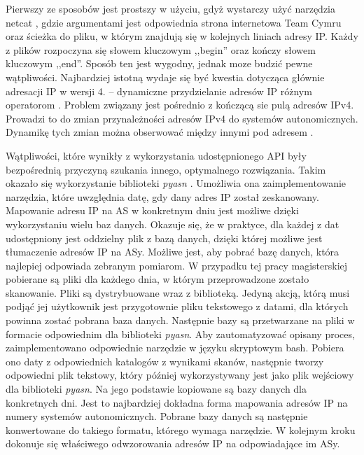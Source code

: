 Pierwszy ze sposobów jest prostszy w użyciu, gdyż wystarczy użyć narzędzia netcat \cite{netcat}, gdzie argumentami jest odpowiednia
strona internetowa Team Cymru \cite{cymru} oraz ścieżka do pliku, w którym znajdują się w kolejnych liniach adresy IP. Każdy z plików
rozpoczyna się słowem kluczowym ,,begin'' oraz kończy słowem kluczowym ,,end''. Sposób ten jest wygodny, jednak moze budzić pewne
wątpliwości. Najbardziej istotną wydaje się być kwestia dotycząca głównie adresacji IP w wersji 4. -- dynamiczne przydzielanie adresów
IP różnym operatorom \cite{}. Problem związany jest pośrednio z kończącą sie pulą adresów IPv4. Prowadzi to do zmian przynależności
adresów IPv4 do systemów autonomicznych. Dynamikę tych zmian można obserwować między innymi pod adresem \cite{}.

Wątpliwości, które wynikły z wykorzystania udostępnionego API były bezpośrednią przyczyną szukania innego, optymalnego rozwiązania.
Takim okazało się wykorzystanie biblioteki \textit{pyasn} \cite{pyasn}. Umożliwia ona zaimplementowanie narzędzia, które uwzględnia
datę, gdy dany adres IP został zeskanowany. Mapowanie adresu IP na AS w konkretnym dniu jest możliwe dzięki wykorzystaniu wielu baz
danych. Okazuje się, że w praktyce, dla każdej z dat udostępniony jest oddzielny plik z bazą danych, dzięki której możliwe jest
tłumaczenie adresów IP na ASy. Możliwe jest, aby pobrać bazę danych, która najlepiej odpowiada zebranym pomiarom. W przypadku tej
pracy magisterskiej pobierane są pliki dla każdego dnia, w którym przeprowadzone zostało skanowanie. Pliki są dystrybuowane wraz z
biblioteką. Jedyną akcją, którą musi podjąć jej użytkownik jest przygotownie pliku tekstowego z datami, dla których powinna zostać
pobrana baza danych. Następnie bazy są przetwarzane na pliki w formacie odpowiednim dla biblioteki \textit{pyasn}. Aby zautomatyzować
opisany proces, zaimplementowano odpowiednie narzędzie w języku skryptowym bash. Pobiera ono daty z odpowiednich katalogów z wynikami
skanów, następnie tworzy odpowiedni plik tekstowy, który później wykorzystywany jest jako plik wejściowy dla biblioteki \textit{pyasn}.
Na jego podstawie kopiowane są bazy danych dla konkretnych dni. Jest to najbardziej dokładna forma mapowania adresów IP na numery
systemów autonomicznych. Pobrane bazy danych są następnie konwertowane do takiego formatu, którego wymaga narzędzie. W kolejnym kroku
dokonuje się właściwego odwzorowania adresów IP na odpowiadające im ASy.

